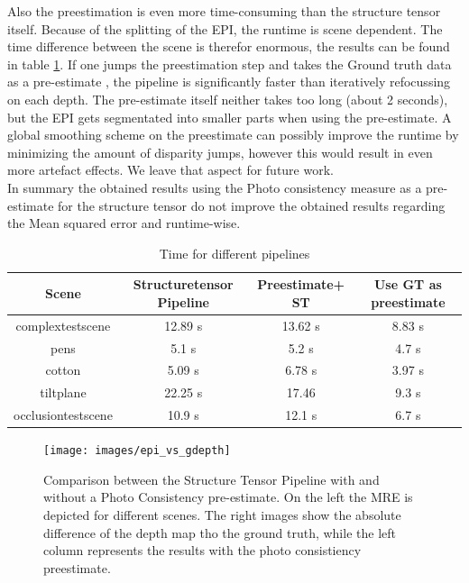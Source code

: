 \documentclass  [
  paper    = a4,
  BCOR     = 10mm,
  twoside,
  fontsize = 12pt,
  fleqn,
  toc      = bibnumbered,
  toc      = listofnumbered,
  numbers  = noendperiod,
  headings = normal,
  listof   = leveldown,
  version  = 3.03
]                                       {scrreprt}
\begin{document}
 	Also the preestimation is even more time-consuming than the structure tensor itself. Because of the splitting of the EPI, the runtime is scene dependent. The time difference between the scene is therefor enormous, the results can be found in table \ref{tab:time_gdepth}. If one jumps the preestimation step and takes the Ground truth data as a \glqq pre-estimate \grqq, the pipeline is significantly faster than iteratively refocussing on each depth. The pre-estimate itself neither takes too long (about 2 seconds), but the EPI gets segmentated into smaller parts when using the pre-estimate. A global smoothing scheme on the preestimate can possibly improve the runtime by minimizing the amount of disparity jumps, however this would result in even more artefact effects. We leave that aspect for future work.\\ In summary the obtained results using the Photo consistency measure as a pre-estimate for the structure tensor do not improve the obtained results regarding the Mean squared error and runtime-wise. 
 	\begin{table}
	\begin{tabular}{|c|c|c|c|}
		\hline 
		Scene & Structuretensor Pipeline & Preestimate+ ST & Use GT as preestimate \\ 
		\hline 
		complextestscene & 12.89 s & 13.62 s & 8.83 s \\ 
		\hline 
		pens & 5.1 s & 5.2 s & 4.7 s \\ 
		\hline 
		cotton & 5.09 s & 6.78 s & 3.97 s \\ 
		\hline 
		tiltplane & 22.25 s & 17.46 &  9.3 s \\ 
		\hline 
		occlusiontestscene & 10.9 s & 12.1 s & 6.7 s \\ 
		\hline 
		
	\end{tabular} 
\label{tab:time_gdepth}
\caption[Time]{Time for different pipelines}
 	\end{table}

 	
 	
 	
 	\begin{figure}
 		\centering
 		\texttt{[image: images/epi\_vs\_gdepth]}
 		\caption[Photoconsistency Preestimate for the structure tensor]{Comparison between the Structure Tensor Pipeline with and without a Photo Consistency pre-estimate. On the left the MRE is depicted for different scenes. The right images show the absolute difference of the depth map tho the ground truth, while the left column represents the results with the photo consistiency preestimate.}
 		\label{fig:epivsgdepth}
 	\end{figure}
 	
\end{document}
